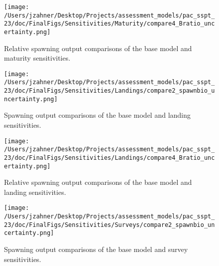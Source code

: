 \documentclass[11pt,
  letterpaper,
]{article}
\begin{document}
\begin{figure}
{\centering
\texttt{[image: /Users/jzahner/Desktop/Projects/assessment\_models/pac\_sspt\_23/doc/FinalFigs/Sensitivities/Maturity/compare4\_Bratio\_uncertainty.png]}
}
\caption{Relative spawning output comparisons of the base model and maturity sensitivities.\label{fig:mat_sensitiv_mngmt}}
\end{figure}

\begin{figure}
{\centering
\texttt{[image: /Users/jzahner/Desktop/Projects/assessment\_models/pac\_sspt\_23/doc/FinalFigs/Sensitivities/Landings/compare2\_spawnbio\_uncertainty.png]}
}
\caption{Spawning output comparisons of the base model and landing sensitivities.\label{fig:land_sensitiv_spawning}}
\end{figure}

\begin{figure}
{\centering
\texttt{[image: /Users/jzahner/Desktop/Projects/assessment\_models/pac\_sspt\_23/doc/FinalFigs/Sensitivities/Landings/compare4\_Bratio\_uncertainty.png]}
}
\caption{Relative spawning output comparisons of the base model and landing sensitivities.\label{fig:land_sensitiv_mngmt}}
\end{figure}

\begin{figure}
{\centering
\texttt{[image: /Users/jzahner/Desktop/Projects/assessment\_models/pac\_sspt\_23/doc/FinalFigs/Sensitivities/Surveys/compare2\_spawnbio\_uncertainty.png]}
}
\caption{Spawning output comparisons of the base model and survey sensitivities.\label{fig:surv_sensitiv_spawning}}
\end{figure}
\end{document}
